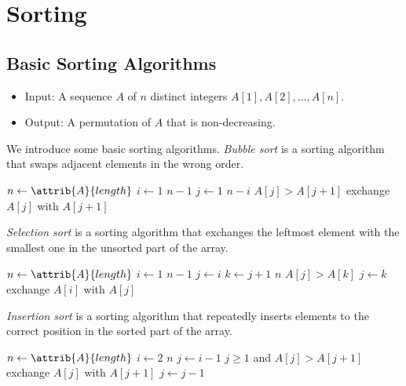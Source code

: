 \chapter{Sorting}
\section{Basic Sorting Algorithms}
\begin{problem}
  \label{prob:sorting}
  \leavevmode
  \begin{itemize}
    \item Input: A sequence $A$ of $n$ distinct integers
    $A[1], A[2], \dots, A[n]$.
    \item Output: A permutation of $A$ that is non-decreasing.
  \end{itemize}
\end{problem}
We introduce some basic sorting algorithms.
\emph{Bubble sort} is a sorting algorithm that swaps adjacent elements in the
wrong order.
\begin{codebox}
  \li $n \gets \attrib{A}{length}$
  \li \For $i \gets 1$ \To $n - 1$ \Do
  \li     \For $j \gets 1$ \To $n - i$ \Do
  \li         \If $A[j] > A[j + 1]$ \Then
  \li             exchange $A[j]$ with $A[j + 1]$
              \End
          \End
      \End
\end{codebox}

\emph{Selection sort} is a sorting algorithm that exchanges the leftmost
element with the smallest one in the unsorted part of the array.
\begin{codebox}
  \li $n \gets \attrib{A}{length}$
  \li \For $i \gets 1$ \To $n - 1$ \Do
  \li     $j \gets i$
  \li     \For $k \gets j + 1$ \To $n$ \Do
  \li         \If $A[j] > A[k]$ \Then
  \li             $j \gets k$
              \End
          \End
  \li     exchange $A[i]$ with $A[j]$
      \End
\end{codebox}

\emph{Insertion sort} is a sorting algorithm that repeatedly inserts elements
to the correct position in the sorted part of the array.
\begin{codebox}
  \li $n \gets \attrib{A}{length}$
  \li \For $i \gets 2$ \To $n$ \Do
  \li     $j \gets i - 1$
  \li     \While $j \geq 1$ and $A[j] > A[j + 1]$ \Do
  \li         exchange $A[j]$ with $A[j + 1]$
  \li         $j \gets j - 1$
          \End
      \End
\end{codebox}